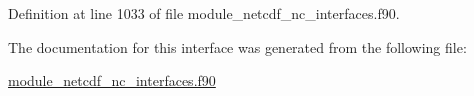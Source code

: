 Definition at line 1033 of file module\+\_\+netcdf\+\_\+nc\+\_\+interfaces.\+f90.



The documentation for this interface was generated from the following file\+:\begin{DoxyCompactItemize}
\item 
\hyperlink{module__netcdf__nc__interfaces_8f90}{module\+\_\+netcdf\+\_\+nc\+\_\+interfaces.\+f90}\end{DoxyCompactItemize}
